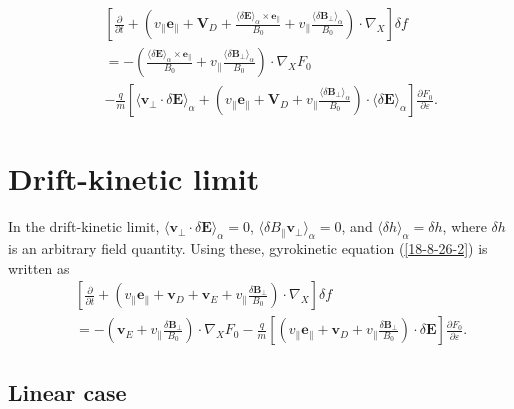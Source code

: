\documentclass{article}
\begin{document}
\begin{eqnarray}
  &  & \left[ \frac{\partial}{\partial t} + \left( v_{\parallel}
  \mathbf{e}_{\parallel} +\mathbf{V}_D + \frac{ \langle \delta \mathbf{E}
  \rangle_{\alpha} \times \mathbf{e}_{\parallel}}{B_0} + v_{\parallel}
  \frac{\langle \delta \mathbf{B}_{\perp} \rangle_{\alpha}}{B_0} \right) \cdot
  \nabla_X \right] \delta f \nonumber\\
  &  & = - \left( \frac{ \langle \delta \mathbf{E} \rangle_{\alpha} \times
  \mathbf{e}_{\parallel}}{B_0} + v_{\parallel} \frac{\langle \delta
  \mathbf{B}_{\perp} \rangle_{\alpha}}{B_0} \right) \cdot \nabla_X F_0
  \nonumber\\
  &  & - \frac{q}{m} \left[ \langle \mathbf{v}_{\perp} \cdot \delta
  \mathbf{E} \rangle_{\alpha} + \left( v_{\parallel} \mathbf{e}_{\parallel}
  +\mathbf{V}_D + v_{\parallel} \frac{\langle \delta \mathbf{B}_{\perp}
  \rangle_{\alpha}}{B_0} \right) \cdot \langle \delta \mathbf{E}
  \rangle_{\alpha} \right] \frac{\partial F_0}{\partial \varepsilon} . 
  \label{18-8-26-2}
\end{eqnarray}


\section{Drift-kinetic limit}

In the drift-kinetic limit, $\langle \mathbf{v}_{\perp} \cdot \delta
\mathbf{E} \rangle_{\alpha} = 0$, $\langle \delta B_{\parallel}
\mathbf{v}_{\perp} \rangle_{\alpha} = 0$, and $\langle \delta h
\rangle_{\alpha} = \delta h$, where $\delta h$ is an arbitrary field quantity.
Using these, gyrokinetic equation (\ref{18-8-26-2}) is written as
\begin{eqnarray}
  &  & \left[ \frac{\partial}{\partial t} + \left( v_{\parallel}
  \mathbf{e}_{\parallel} +\mathbf{v}_D +\mathbf{v}_E + v_{\parallel}
  \frac{\delta \mathbf{B}_{\perp}}{B_0} \right) \cdot \nabla_X \right] \delta
  f \nonumber\\
  &  & = - \left( \mathbf{v}_E + v_{\parallel} \frac{\delta
  \mathbf{B}_{\perp}}{B_0} \right) \cdot \nabla_X F_0 - \frac{q}{m} \left[
  \left( v_{\parallel} \mathbf{e}_{\parallel} +\mathbf{v}_D + v_{\parallel}
  \frac{\delta \mathbf{B}_{\perp}}{B_0} \right) \cdot \delta \mathbf{E}
  \right] \frac{\partial F_0}{\partial \varepsilon} .  \label{17-5-14-e1}
\end{eqnarray}

\subsection{Linear case}
\end{document}
